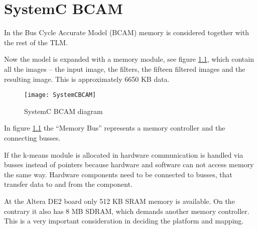 \chapter{SystemC BCAM}
In the Bus Cycle Accurate Model (BCAM) memory is considered together with the rest of the TLM. 

Now the model is expanded with a memory module, see figure \ref{fig:BCAM}, which contain all the images -- the input image, the filters, the fifteen filtered images and the resulting image. This is approximately 6650 KB data.

\begin{figure}[H]
\centering
\texttt{[image: SystemCBCAM]}
\caption{SystemC BCAM diagram}
\label{fig:BCAM}
\end{figure}

\noindent In figure \ref{fig:BCAM} the ``Memory Bus'' represents a memory controller and the connecting busses.

If the k-means module is allocated in hardware communication is handled via busses instead of pointers because hardware and software can not access memory the same way. Hardware components need to be connected to busses, that transfer data to and from the component.

At the Altera DE2 board only 512 KB SRAM memory is available. 
On the contrary it also has 8 MB SDRAM, which demands another memory controller. 
This is a very important consideration in deciding the platform and mapping.


